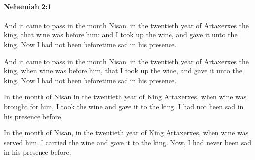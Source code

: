 		\paragraph{Nehemiah 2:1} %
			\label{NEHEMIAH-2-1}

			And it came to pass in the month Nisan, in the twentieth year of Artaxerxes the king, that wine was before him: and I took up the wine, and gave it unto the king. Now I had not been beforetime sad in his presence.

			\begin{versebox}
					\item[BHS] 
					\item[LXX] 
					\item[ASV] And it came to pass in the month Nisan, in the twentieth year of Artaxerxes the king, when wine was before him, that I took up the wine, and gave it unto the king. Now I had not been beforetime sad in his presence.
					\item[NIV] In the month of Nisan in the twentieth year of King Artaxerxes, when wine was brought for him, I took the wine and gave it to the king. I had not been sad in his presence before,
					\item[NRSV] In the month of Nisan, in the twentieth year of King Artaxerxes, when wine was served him, I carried the wine and gave it to the king. Now, I had never been sad in his presence before.
			\end{versebox}

